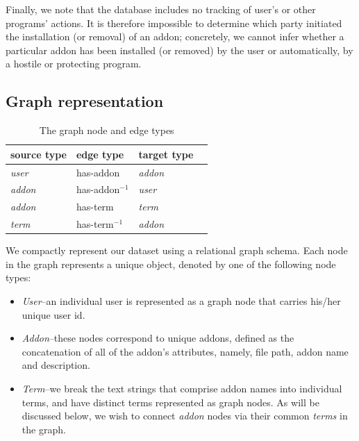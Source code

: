 \documentclass[ijoc,nonblindrev]{informs3} %
\numberwithin{equation}{subsection}
\begin{document}
Finally, we note that the database includes no tracking of user's or other programs' actions. It is therefore impossible to determine which party initiated the installation (or removal) of an addon; concretely, we cannot infer whether a particular addon has been installed (or removed) by the user or automatically, by a hostile or protecting program. 

\subsection{Graph representation}
\label{tab:graph_representation}

\begin{table}[t]
\begin{center}
\begin{small}
\begin{tabular}{llll}
\hline 
\textbf{source type} & \textbf{edge type} & \textbf{target type} \\
\hline
{\it user} & has-addon & {\it addon} \\
\hline
{\it addon} &  has-addon$^{-1}$ & {\it user} \\
{\it addon} & has-term & {\it term} \\
\hline
{\it term} & has-term$^{-1}$ & {\it addon} \\
\hline
\end{tabular}
\end{small}
\end{center}
\caption{\label{tab:graph_structure} The graph node and edge types}
\end{table}

We compactly represent our dataset using a relational graph schema. Each node in the graph represents a unique object, denoted by one of the following node types:
\begin{itemize}
\renewcommand{\labelitemi}{$\bullet$} 
\item {\it User}--an individual user is represented as a graph node that carries his/her unique user id. 
\item {\it Addon}--these nodes correspond to unique addons, defined as the concatenation of all of the addon's attributes, namely, file path, addon name and description.
\item {\it Term}--we break the text strings that comprise addon names into individual terms, and have distinct terms represented as graph nodes. As will be discussed below, we wish to connect {\it addon} nodes via their common {\it terms} in the graph.
\end{itemize}
\end{document}
